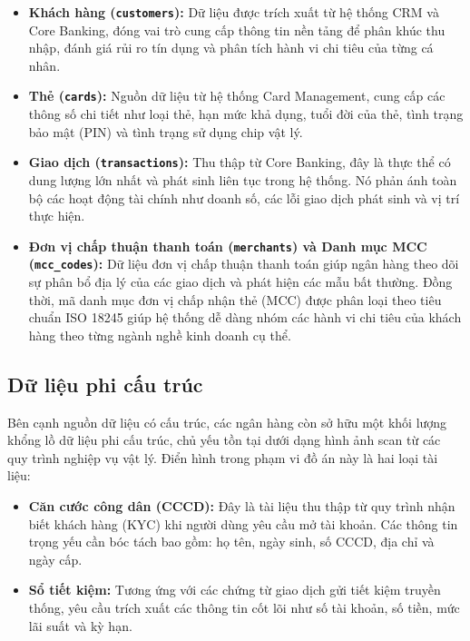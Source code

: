 \begin{itemize}
    \item \textbf{Khách hàng (\texttt{customers}):} Dữ liệu được trích xuất từ hệ thống CRM và Core Banking, đóng vai trò cung cấp thông tin nền tảng để phân khúc thu nhập, đánh giá rủi ro tín dụng và phân tích hành vi chi tiêu của từng cá nhân.
    \item \textbf{Thẻ (\texttt{cards}):} Nguồn dữ liệu từ hệ thống Card Management, cung cấp các thông số chi tiết như loại thẻ, hạn mức khả dụng, tuổi đời của thẻ, tình trạng bảo mật (PIN) và tình trạng sử dụng chip vật lý.
    \item \textbf{Giao dịch (\texttt{transactions}):} Thu thập từ Core Banking, đây là thực thể có dung lượng lớn nhất và phát sinh liên tục trong hệ thống. Nó phản ánh toàn bộ các hoạt động tài chính như doanh số, các lỗi giao dịch phát sinh và vị trí thực hiện.
    \item \textbf{Đơn vị chấp thuận thanh toán (\texttt{merchants}) và Danh mục MCC (\texttt{mcc\_codes}):} Dữ liệu đơn vị chấp thuận thanh toán giúp ngân hàng theo dõi sự phân bổ địa lý của các giao dịch và phát hiện các mẫu bất thường. Đồng thời, mã danh mục đơn vị chấp nhận thẻ (MCC) được phân loại theo tiêu chuẩn ISO 18245 giúp hệ thống dễ dàng nhóm các hành vi chi tiêu của khách hàng theo từng ngành nghề kinh doanh cụ thể.
\end{itemize}

\subsection{Dữ liệu phi cấu trúc}

Bên cạnh nguồn dữ liệu có cấu trúc, các ngân hàng còn sở hữu một khối lượng khổng lồ dữ liệu phi cấu trúc, chủ yếu tồn tại dưới dạng hình ảnh scan từ các quy trình nghiệp vụ vật lý. Điển hình trong phạm vi đồ án này là hai loại tài liệu:

\begin{itemize}
    \item \textbf{Căn cước công dân (CCCD):} Đây là tài liệu thu thập từ quy trình nhận biết khách hàng (KYC) khi người dùng yêu cầu mở tài khoản. Các thông tin trọng yếu cần bóc tách bao gồm: họ tên, ngày sinh, số CCCD, địa chỉ và ngày cấp.
    \item \textbf{Sổ tiết kiệm:} Tương ứng với các chứng từ giao dịch gửi tiết kiệm truyền thống, yêu cầu trích xuất các thông tin cốt lõi như số tài khoản, số tiền, mức lãi suất và kỳ hạn.
\end{itemize}

